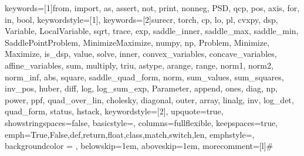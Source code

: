 
\usepackage{listings}
\usepackage{xcolor}







\lstset{style=mystyle}

{
keywords=[1]{from, import, as, assert, not, print, nonneg, PSD, qcp, pos, axis,
             for, in, bool},
keywordstyle=[1]{\color{mediumviolet-red}},
keywords=[2]{surecr, torch, cp, lo, pl, cvxpy, dsp, Variable, LocalVariable,
        sqrt, trace, exp, saddle_inner, saddle_max, saddle_min, SaddlePointProblem, MinimizeMaximize,
        numpy, np, Problem, Minimize, Maximize, is_dsp, value, solve, inner,
        convex_variables, concave_variables, affine_variables, sum, multiply,
        triu, astype,
        arange, range, norm1, norm2, norm_inf, abs, square, saddle_quad_form, norm,
        sum_values, sum_squares, inv_pos, huber, diff, log, log_sum_exp, Parameter,
        append, ones, diag, np, power, ppf, quad_over_lin, cholesky,
        diagonal, outer, array, linalg, inv, log_det, quad_form, status, hstack},
keywordstyle=[2]{\color{seagreen}},
upquote=true,
showstringspaces=false,
basicstyle=\ttfamily\small,
columns=fullflexible,
keepspaces=true,
emph={True,False,def,return,float,class,match,switch,len},
emphstyle={\color{seagreen}},
backgroundcolor = \color{background-gray},
belowskip=1em,
aboveskip=1em,
morecomment=[l]{\#}
}